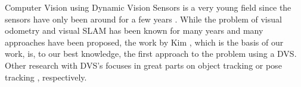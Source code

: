 Computer Vision using Dynamic Vision Sensors is a very young field since the sensors have only been around for a few years \cite{lpd08dvs, brandli14davis}.
While the problem of visual odometry and visual SLAM has been known for many years and many approaches have been proposed, the work by Kim \etal \cite{kim2014simultaneous}, which is the basis of our work, is, to our best knowledge, the first approach to the problem using a DVS.
Other research with DVS's focuses in great parts on object tracking \cite{vmv.20141280, conradt2009embedded} or pose tracking \cite{mueggler2014event}, respectively.